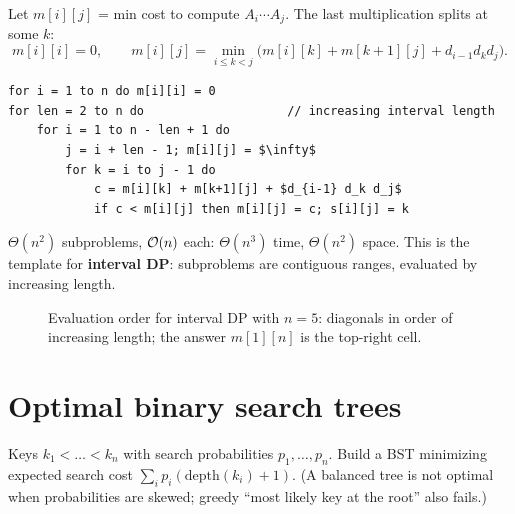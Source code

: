 Let $m[i][j]$ = min cost to compute $A_i\cdots A_j$. The last multiplication splits at some $k$:
\[
m[i][i]=0,\qquad m[i][j]=\min_{i\le k<j}\bigl(m[i][k]+m[k+1][j]+d_{i-1}d_kd_j\bigr).
\]
\begin{lstlisting}[style=pseudo]
for i = 1 to n do m[i][i] = 0
for len = 2 to n do                    // increasing interval length
    for i = 1 to n - len + 1 do
        j = i + len - 1; m[i][j] = $\infty$
        for k = i to j - 1 do
            c = m[i][k] + m[k+1][j] + $d_{i-1} d_k d_j$
            if c < m[i][j] then m[i][j] = c; s[i][j] = k
\end{lstlisting}
$\Theta(n^2)$ subproblems, $\mathcal{O}(n)$ each: $\Theta(n^3)$ time, $\Theta(n^2)$ space. This is the template for
\textbf{interval DP}: subproblems are contiguous ranges, evaluated by increasing length.

\begin{figure}[H]
\centering
{}
\caption{Evaluation order for interval DP with $n=5$: diagonals in order of
increasing length; the answer $m[1][n]$ is the top-right cell.}
\end{figure}

\section{Optimal binary search trees}
Keys $k_1<\dots<k_n$ with search probabilities $p_1,\dots,p_n$. Build a BST minimizing expected search cost
$\sum_i p_i(\mathrm{depth}(k_i)+1)$. (A balanced tree is not optimal when probabilities are skewed; greedy ``most likely key at
the root'' also fails.)

